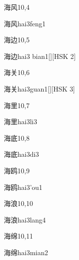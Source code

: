\begin{entry}{海风}{10,4}
  \begin{phonetics}{海风}{hai3feng1}
  \end{phonetics}
\end{entry}

\begin{entry}{海边}{10,5}
  \begin{phonetics}{海边}{hai3 bian1}[][HSK 2]
  \end{phonetics}
\end{entry}

\begin{entry}{海关}{10,6}
  \begin{phonetics}{海关}{hai3guan1}[][HSK 3]
  \end{phonetics}
\end{entry}

\begin{entry}{海里}{10,7}
  \begin{phonetics}{海里}{hai3li3}
  \end{phonetics}
\end{entry}

\begin{entry}{海底}{10,8}
  \begin{phonetics}{海底}{hai3di3}
  \end{phonetics}
\end{entry}

\begin{entry}{海鸥}{10,9}
  \begin{phonetics}{海鸥}{hai3'ou1}
  \end{phonetics}
\end{entry}

\begin{entry}{海浪}{10,10}
  \begin{phonetics}{海浪}{hai3lang4}
  \end{phonetics}
\end{entry}

\begin{entry}{海绵}{10,11}
  \begin{phonetics}{海绵}{hai3mian2}
  \end{phonetics}
\end{entry}

